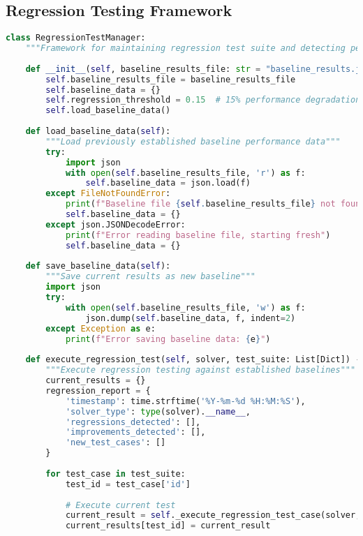 \subsection{Regression Testing Framework}
\label{appendix:regression-testing}

\begin{lstlisting}[language=Python, caption=Regression Testing Framework]
class RegressionTestManager:
    """Framework for maintaining regression test suite and detecting performance degradation"""
    
    def __init__(self, baseline_results_file: str = "baseline_results.json"):
        self.baseline_results_file = baseline_results_file
        self.baseline_data = {}
        self.regression_threshold = 0.15  # 15% performance degradation threshold
        self.load_baseline_data()
    
    def load_baseline_data(self):
        """Load previously established baseline performance data"""
        try:
            import json
            with open(self.baseline_results_file, 'r') as f:
                self.baseline_data = json.load(f)
        except FileNotFoundError:
            print(f"Baseline file {self.baseline_results_file} not found, starting fresh")
            self.baseline_data = {}
        except json.JSONDecodeError:
            print(f"Error reading baseline file, starting fresh")
            self.baseline_data = {}
    
    def save_baseline_data(self):
        """Save current results as new baseline"""
        import json
        try:
            with open(self.baseline_results_file, 'w') as f:
                json.dump(self.baseline_data, f, indent=2)
        except Exception as e:
            print(f"Error saving baseline data: {e}")
    
    def execute_regression_test(self, solver, test_suite: List[Dict]) -> Dict[str, Any]:
        """Execute regression testing against established baselines"""
        current_results = {}
        regression_report = {
            'timestamp': time.strftime('%Y-%m-%d %H:%M:%S'),
            'solver_type': type(solver).__name__,
            'regressions_detected': [],
            'improvements_detected': [],
            'new_test_cases': []
        }
        
        for test_case in test_suite:
            test_id = test_case['id']
            
            # Execute current test
            current_result = self._execute_regression_test_case(solver, test_case)
            current_results[test_id] = current_result
            

\end{lstlisting}
